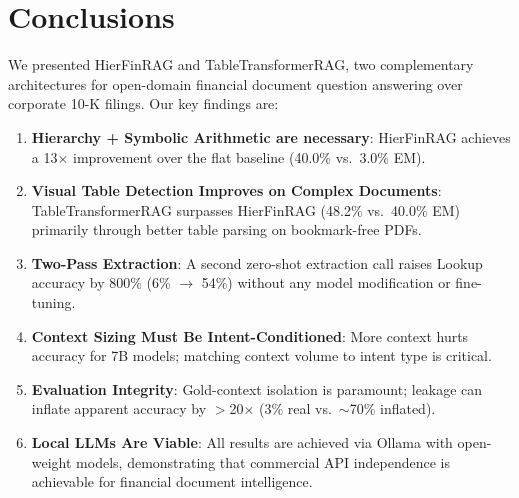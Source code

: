 \documentclass[conference]{IEEEtran}
\begin{document}
\balance
\section{Conclusions}

We presented HierFinRAG and TableTransformerRAG, two complementary architectures
for open-domain financial document question answering over corporate 10-K filings.
Our key findings are:

\begin{enumerate}
  \item \textbf{Hierarchy + Symbolic Arithmetic are necessary}: HierFinRAG
        achieves a 13$\times$ improvement over the flat baseline (40.0\% vs.\
        3.0\% EM).
  \item \textbf{Visual Table Detection Improves on Complex Documents}:
        TableTransformerRAG surpasses HierFinRAG (48.2\% vs.\ 40.0\% EM)
        primarily through better table parsing on bookmark-free PDFs.
  \item \textbf{Two-Pass Extraction}: A second zero-shot extraction call
        raises Lookup accuracy by 800\% (6\% $\to$ 54\%) without any model
        modification or fine-tuning.
  \item \textbf{Context Sizing Must Be Intent-Conditioned}: More context
        hurts accuracy for 7B models; matching context volume to intent type
        is critical.
  \item \textbf{Evaluation Integrity}: Gold-context isolation is paramount;
        leakage can inflate apparent accuracy by $>$20$\times$ (3\% real
        vs.\ $\sim$70\% inflated).
  \item \textbf{Local LLMs Are Viable}: All results are achieved via Ollama
        with open-weight models, demonstrating that commercial API independence
        is achievable for financial document intelligence.
\end{enumerate}

\end{document}

